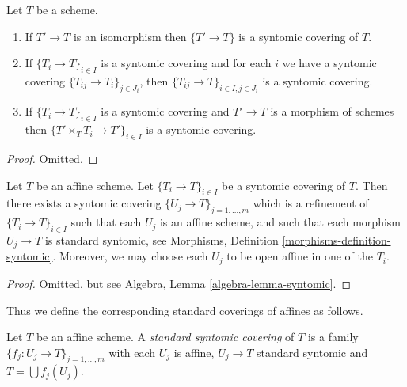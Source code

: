 \begin{lemma}
\label{lemma-syntomic}
Let $T$ be a scheme.
\begin{enumerate}
\item If $T' \to T$ is an isomorphism then $\{T' \to T\}$
is a syntomic covering of $T$.
\item If $\{T_i \to T\}_{i\in I}$ is a syntomic covering and for each
$i$ we have a syntomic covering $\{T_{ij} \to T_i\}_{j\in J_i}$, then
$\{T_{ij} \to T\}_{i \in I, j\in J_i}$ is a syntomic covering.
\item If $\{T_i \to T\}_{i\in I}$ is a syntomic covering
and $T' \to T$ is a morphism of schemes then
$\{T' \times_T T_i \to T'\}_{i\in I}$ is a syntomic covering.
\end{enumerate}
\end{lemma}

\begin{proof}
Omitted.
\end{proof}

\begin{lemma}
\label{lemma-syntomic-affine}
Let $T$ be an affine scheme.
Let $\{T_i \to T\}_{i \in I}$ be a syntomic covering of $T$.
Then there exists a syntomic covering
$\{U_j \to T\}_{j = 1, \ldots, m}$ which is a refinement
of $\{T_i \to T\}_{i \in I}$ such that each $U_j$ is an affine
scheme, and such that each morphism $U_j \to T$ is standard
syntomic, see Morphisms, Definition \ref{morphisms-definition-syntomic}.
Moreover, we may choose each $U_j$ to be open affine in one of the $T_i$.
\end{lemma}

\begin{proof}
Omitted, but see Algebra, Lemma \ref{algebra-lemma-syntomic}.
\end{proof}

\noindent
Thus we define the corresponding standard coverings of affines as follows.

\begin{definition}
\label{definition-standard-syntomic}
Let $T$ be an affine scheme. A {\it standard syntomic covering} of $T$ is
a family $\{f_j : U_j \to T\}_{j = 1, \ldots, m}$ with each $U_j$ is
affine, $U_j \to T$ standard syntomic and $T = \bigcup f_j(U_j)$.
\end{definition}

